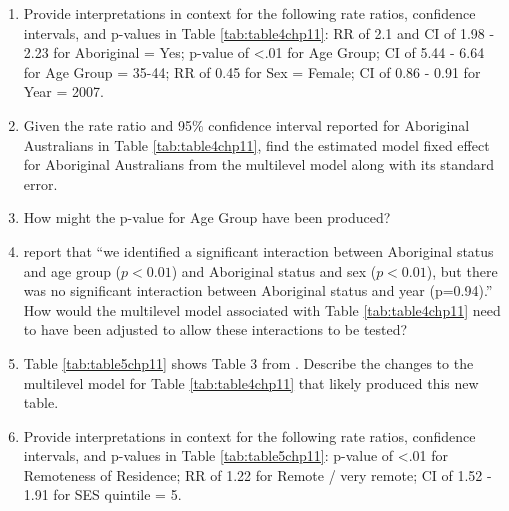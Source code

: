 \documentclass[
]{krantz}
\begin{document}
\begin{enumerate}
\def\labelenumi{\arabic{enumi}.}
\setcounter{enumi}{20}
\item
  Provide interpretations in context for the following rate ratios, confidence intervals, and p-values in Table \ref{tab:table4chp11}: RR of 2.1 and CI of 1.98 - 2.23 for Aboriginal = Yes; p-value of \textless.01 for Age Group; CI of 5.44 - 6.64 for Age Group = 35-44; RR of 0.45 for Sex = Female; CI of 0.86 - 0.91 for Year = 2007.
\item
  Given the rate ratio and 95\% confidence interval reported for Aboriginal Australians in Table \ref{tab:table4chp11}, find the estimated model fixed effect for Aboriginal Australians from the multilevel model along with its standard error.
\item
  How might the p-value for Age Group have been produced?
\item
  \citet{Randall2014} report that ``we identified a significant interaction between Aboriginal status and age group (\(p<0.01\)) and Aboriginal status and sex (\(p<0.01\)), but there was no significant interaction between Aboriginal status and year (p=0.94).'' How would the multilevel model associated with Table \ref{tab:table4chp11} need to have been adjusted to allow these interactions to be tested?
\item
  Table \ref{tab:table5chp11} shows Table 3 from \citet{Randall2014}. Describe the changes to the multilevel model for Table \ref{tab:table4chp11} that likely produced this new table.
\item
  Provide interpretations in context for the following rate ratios, confidence intervals, and p-values in Table \ref{tab:table5chp11}: p-value of \textless.01 for Remoteness of Residence; RR of 1.22 for Remote / very remote; CI of 1.52 - 1.91 for SES quintile = 5.
\end{enumerate}
\end{document}
